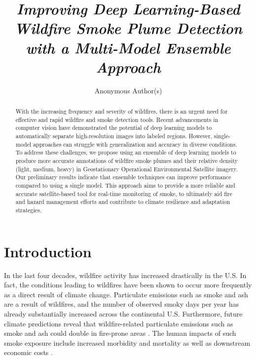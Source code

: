 \documentclass{article}
\title{\textit{Improving Deep Learning-Based Wildfire Smoke Plume Detection with a Multi-Model Ensemble Approach}}
\author{%
Anonymous Author(s)
}
\begin{document}
\maketitle

\begin{abstract}
With the increasing frequency and severity of wildfires, there is an urgent need for effective and rapid wildfire and smoke detection tools. Recent advancements in computer vision have demonstrated the potential of deep learning models to automatically separate high-resolution images into labeled regions. However, single-model approaches can struggle with generalization and accuracy in diverse conditions. To address these challenges, we propose using an ensemble of deep learning models to produce more accurate annotations of wildfire smoke plumes and their relative density (light, medium, heavy) in Geostationary Operational Environmental Satellite imagery. Our preliminary results indicate that ensemble techniques can improve performance compared to using a single model. This approach aims to provide a more reliable and accurate satellite-based tool for real-time monitoring of smoke, to ultimately aid fire and hazard management efforts and contribute to climate resilience and adaptation strategies.
\end{abstract}

\section{Introduction}
In the last four decades, wildfire activity has increased drastically in the U.S. In fact, the conditions leading to wildfires have been shown to occur more frequently as a direct result of climate change. Particulate emissions such as smoke and ash are a result of wildfires, and the number of observed smoky days per year has already substantially increased across the continental U.S. Furthermore, future climate predictions reveal that wildfire-related particulate emissions such as smoke and ash could double in fire-prone areas \citep{wildfire-risk}. The human impacts of such smoke exposure include increased morbidity and mortality as well as downstream economic costs \citep{health-impacts}.
\end{document}
